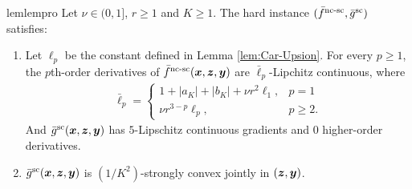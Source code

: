 \documentclass{article}
\begin{document}
\begin{restatable}{lem}{lempro}
\label{lem:property}
Let $\nu \in (0,1]$, $r \ge 1$ and $K \ge 1$.
The hard instance $(\bar f^{\text{nc-sc}}, \bar g^{\rm sc})$ satisfies:
\begin{enumerate}
    \item 
    Let  $\ell_p$ be the constant defined in Lemma \ref{lem:Car-Upsion}.
    For every $p \ge 1$, the $p$th-order derivatives of $\bar f^{\text{nc-sc}}({\bm{x}},{\bm{z}},{\bm{y}})$ are $\bar \ell_p$-Lipchitz continuous, where 
    \begin{align*}
      \bar \ell_p = 
      \begin{cases}
          1 +|a_K|  + |b_K| + \nu r^2 \ell_1, & p =1 \\
          \nu r^{3-p}  \ell_p, & p \ge 2.
      \end{cases}
    \end{align*}
    And $\bar g^{\rm sc}({\bm{x}},{\bm{z}}, {\bm{y}})$ has $5$-Lipschitz continuous gradients and $0$ higher-order derivatives.    
    \item $\bar g^{\rm sc}({\bm{x}},{\bm{z}},{\bm{y}})$ is  $(1/K^2)$-strongly convex jointly in $({\bm{z}},{\bm{y}})$.
\end{enumerate}
\end{restatable}
\end{document}

